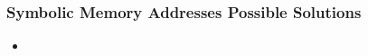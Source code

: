 \begin{frame}
	\frametitle{Symbolic Memory Addresses \newline{} Possible Solutions}
	\begin{itemize}
		\item
	\end{itemize}
\end{frame}